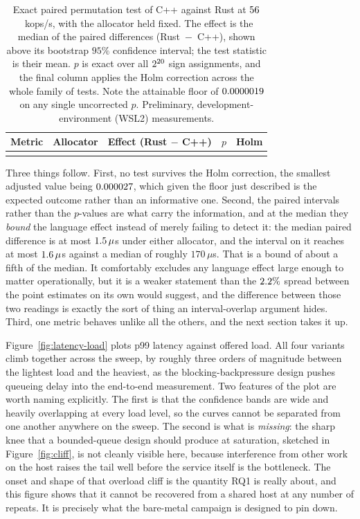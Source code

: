 \documentclass[english,twoside,openright,a4paper,censored,csm,software-track-2020]{HYthesisML}
\begin{document}
\begin{table}
\centering
\small
\caption{Exact paired permutation test of C++ against Rust at $56$~kops/s, with the
allocator held fixed. The effect is the median of the \NRepeats{} paired differences
(Rust~$-$~C++), shown above its bootstrap $95\%$ confidence interval; the test statistic is
their mean. $p$ is exact over all $2^{20}$ sign assignments, and the final column
applies the Holm correction across the whole family of \NTests{} tests. Note the attainable
floor of $0.0000019$ on any single uncorrected $p$. Preliminary,
development-environment (WSL2) measurements.\label{tab:significance}}
\begin{tabular}{@{}l l r r r@{}}
\hline\hline
Metric & Allocator & Effect (Rust $-$ C++) & $p$ & Holm \\
\hline
\\
\hline
\end{tabular}
\end{table}

Three things follow. First, no test survives the Holm correction, the smallest adjusted value
being $0.000027$, which given the floor just described is the expected outcome rather than
an informative one. Second, the paired intervals rather than the $p$-values are what carry the
information, and at the median they \emph{bound} the language effect instead of merely failing
to detect it: the median paired difference is at most $1.5\,\mu$s under either
allocator, and the interval on it reaches at most $1.6\,\mu$s against a median of
roughly $170\,\mu$s. That is a bound of about a fifth of the median. It comfortably excludes
any language effect large enough to matter operationally, but it is a weaker statement than the
$2.2\%$ spread between the point estimates on its own would suggest, and the
difference between those two readings is exactly the sort of thing an interval-overlap argument
hides. Third, one metric behaves unlike all the others, and the next section takes it up.

Figure~\ref{fig:latency-load} plots p99 latency against offered load. All four variants climb
together across the sweep, by roughly three orders of magnitude between the lightest load and
the heaviest, as the blocking-backpressure design pushes queueing delay into the end-to-end
measurement. Two features of the plot are worth naming explicitly. The first is that the
confidence bands are wide and heavily overlapping at every load level, so the curves cannot be
separated from one another anywhere on the sweep. The second is what is \emph{missing}: the
sharp knee that a bounded-queue design should produce at saturation, sketched in
Figure~\ref{fig:cliff}, is not cleanly visible here, because interference from other work on
the host raises the tail well before the service itself is the bottleneck. The onset and shape
of that overload cliff is the quantity RQ1 is really about, and this figure shows that it
cannot be recovered from a shared host at any number of repeats. It is precisely what the
bare-metal campaign is designed to pin down.
\end{document}
